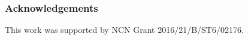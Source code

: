 \documentclass{bioinfo}
\begin{document}
\subsubsection*{Acknowledgements}
This work was supported by NCN Grant 2016/21/B/ST6/02176.


%
%
%
%
%
%
%

\end{document}
